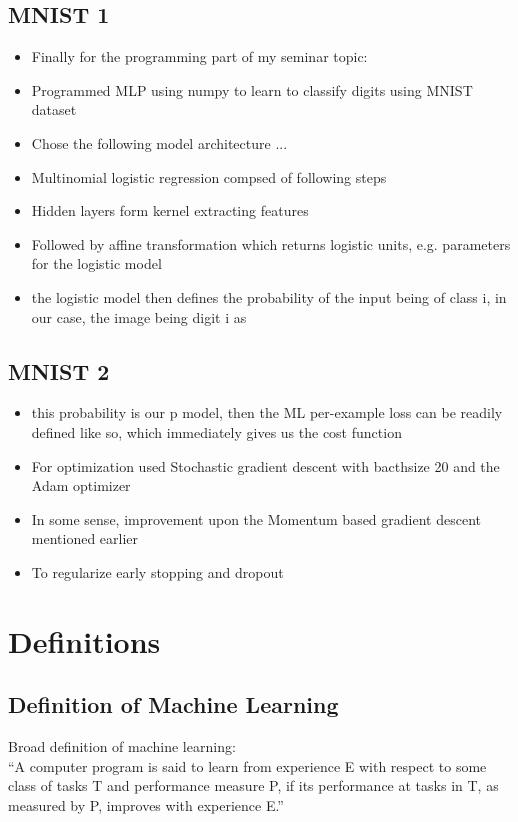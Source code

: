 \documentclass{article}
\begin{document}
\subsection*{MNIST 1 }
\begin{itemize}
    \item Finally for the programming part of my seminar topic:
    \item Programmed MLP using numpy to learn to classify digits using MNIST dataset
    \item Chose the following model architecture ...
    \item Multinomial logistic regression compsed of following steps
    \item Hidden layers form kernel extracting features
    \item Followed by affine transformation which returns logistic units, e.g. parameters for the logistic model
    \item the logistic model then defines the probability of the input being of class i, in our case, the image being digit i as
\end{itemize}

\subsection*{MNIST 2}
\begin{itemize}
    \item this probability is our p model, then the ML per-example loss can be readily defined like so, which immediately gives us the cost function
    \item For optimization used Stochastic gradient descent with bacthsize 20 and the Adam optimizer
    \item In some sense, improvement upon the Momentum based gradient descent mentioned earlier
    \item To regularize early stopping and dropout
\end{itemize}

\newpage


\section{Definitions}
\subsection{Definition of Machine Learning}
Broad definition of machine learning: \\
“A computer program is said to learn from experience E 
with respect to some class of tasks T and performance measure P, 
if its performance at tasks in T, as measured by P, improves with
experience E.”
\end{document}
